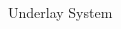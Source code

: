\documentclass[16pt]{beamer}
\newcommand{\fs}[2]{\fontsize{#1 pt}{#2}\selectfont}
\begin{document}
\begin{frame}[t]{Underlay System}
\begin{columns}
\begin{column}{0.38\columnwidth}
		\end{column}
		\begin{column}{0.62\columnwidth}
		\fs{8}{8}
		\begin{center}
			\begin{overlayarea}{\textwidth}{4.6cm}
				\only<1>
				{	
					\vspace{3mm}
					}
\end{overlayarea}
\end{center}
\end{column}
\end{columns}
\end{frame}
\end{document}
